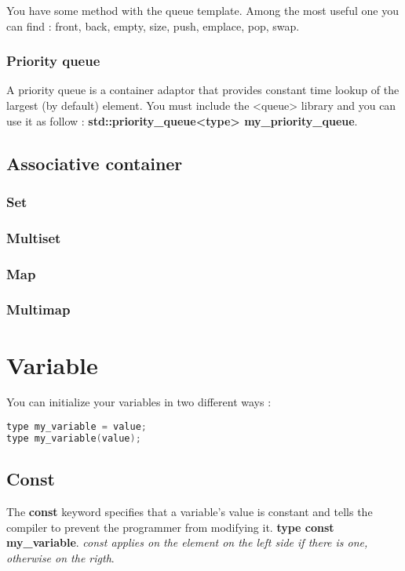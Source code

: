 \documentclass[a4paper, 12pt, titlepage]{scrartcl} %
\begin{document}
You have some method with the queue template. Among the most useful one you can find : front, back, empty, size, push, emplace, pop, swap.

\subsubsection{Priority queue}
A priority queue is a container adaptor that provides constant time lookup of the largest (by default) element. You must include the <queue> library and you can use it as follow : \textbf{std::priority\_queue<type> my\_priority\_queue}.

\subsection{Associative container}
\subsubsection{Set}
\subsubsection{Multiset}
\subsubsection{Map}
\subsubsection{Multimap}

\newpage
\section{Variable}

You can initialize your variables in two different ways :
\begin{lstlisting}[language=C++]
type my_variable = value;
type my_variable(value);
\end{lstlisting} \vspace{5mm}

\subsection{Const}
The \textbf{const} keyword specifies that a variable's value is constant and tells the compiler to prevent the programmer from modifying it. \textbf{type const my\_variable}. \textit{const applies on the element on the left side if there is one, otherwise on the rigth}.
\end{document}
